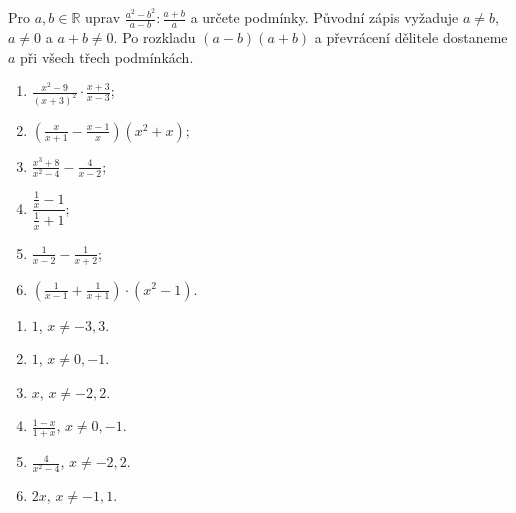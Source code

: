\documentclass[11pt,a4paper]{article}
\begin{document}
\begin{zadaniReseniBox}[breakable=false,title={Rozšíření 1}]
Pro $a,b\in\mathbb R$ uprav $\displaystyle\frac{a^2-b^2}{a-b}:\frac{a+b}{a}$ a určete podmínky.
\tcblower
Původní zápis vyžaduje $a\ne b$, $a\ne0$ a $a+b\ne0$. Po rozkladu $(a-b)(a+b)$ a převrácení dělitele dostaneme $a$ při všech třech podmínkách.
\end{zadaniReseniBox}
\begin{zadaniReseniBox}[breakable=false,title={Domácí úkol}]
\begin{enumerate}[label=\alph*)]
\item $\frac{x^2-9}{(x+3)^2}\cdot\frac{x+3}{x-3}$;
\item $\left(\frac{x}{x+1}-\frac{x-1}{x}\right)(x^2+x)$;
\item $\frac{x^3+8}{x^2-4}-\frac4{x-2}$;
\item $\dfrac{\frac1x-1}{\frac1x+1}$;
\item $\frac{1}{x-2}-\frac{1}{x+2}$;
\item $\left(\frac1{x-1}+\frac1{x+1}\right)\cdot(x^2-1)$.
\end{enumerate}
\tcblower
\begin{enumerate}[label=\alph*)]
\item $1$, $x\ne-3,3$.
\item $1$, $x\ne0,-1$.
\item $x$, $x\ne-2,2$.
\item $\frac{1-x}{1+x}$, $x\ne0,-1$.
\item $\frac4{x^2-4}$, $x\ne-2,2$.
\item $2x$, $x\ne-1,1$.
\end{enumerate}
\end{zadaniReseniBox}
\end{document}
